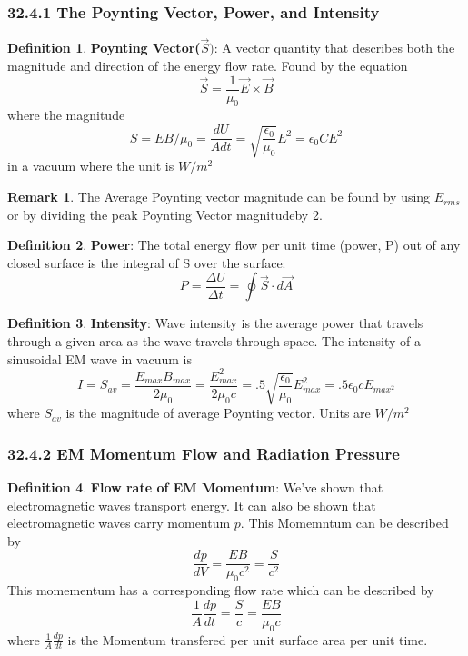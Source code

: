 \documentclass[12pt]{amsart}
\theoremstyle{definition}
\newtheorem{definition}{Definition} %
\newtheorem*{remark}{Remark}        %
\numberwithin{equation}{theorem}    %
\begin{document}
\subsubsection*{32.4.1 The Poynting Vector, Power, and Intensity}
\begin{definition}
    \textbf{Poynting Vector($\vec{S})$}:
    A vector quantity that describes both the magnitude and direction of the energy flow rate. Found by the equation
    $$\vec{S}=\frac{1}{\mu_0}\vec{E}\times\vec{B}$$ where the magnitude $$S = EB/\mu_0 =\frac{dU}{Adt} =\sqrt{\frac{\epsilon_0}{\mu_0}}E^2 = \epsilon_0CE^2$$ in a vacuum where the unit is $W/m^2$ 
    \begin{remark}
        The Average Poynting vector magnitude can be found by using $E_{rms}$ or by dividing the peak Poynting Vector magnitudeby 2.
    \end{remark}
\end{definition}

\begin{definition}
    \textbf{Power}:
    The total energy flow per unit time (power, P) out of any closed surface is the integral of S over the surface:
    $$P = \frac{\Delta U}{\Delta t} = \oint\vec{S}\cdot d\vec{A} $$
\end{definition}

\begin{definition}
    \textbf{Intensity}:
    Wave intensity is the average power that travels through a given area as the wave travels through space. The intensity of a sinusoidal EM wave in vacuum is 
    $$I = S_{av} = \frac{E_{max}B_{max}}{2\mu_0} = \frac{E_{max}^2}{2\mu_0c} = .5\sqrt{\frac{\epsilon_0}{\mu_0}}E_{max}^2 = 
    .5\epsilon_0cE_{max{^2}}$$ where $S_{av}$ is the magnitude of average Poynting vector. Units are $W/m^2$
\end{definition}

\subsubsection*{32.4.2 EM Momentum Flow and Radiation Pressure}

\begin{definition}
    \textbf{Flow rate of EM Momentum}:
    We’ve shown that electromagnetic waves transport energy. It can also be shown that electromagnetic waves carry momentum $p$. This Momemntum can be described by $$\frac{dp}{dV} = \frac{EB}{\mu_0c^2} = \frac{S}{c^2}$$ This momementum has a corresponding flow rate which can be described by 
    $$\frac{1}{A}\frac{dp}{dt} = \frac{S}{c} = \frac{EB}{\mu_0c}$$ where $\frac{1}{A}\frac{dp}{dt} $ is the Momentum transfered per unit surface area per unit time.
\end{definition}
\end{document}
